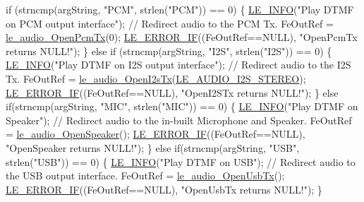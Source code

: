 \begin{DoxyCodeInclude}
{{{{{{{{{{{    \textcolor{keywordflow}{if} (strncmp(argString, \textcolor{stringliteral}{"PCM"}, strlen(\textcolor{stringliteral}{"PCM"})) == 0)
    \{
        \hyperlink{le__log_8h_a23e6d206faa64f612045d688cdde5808}{LE\_INFO}(\textcolor{stringliteral}{"Play DTMF on PCM output interface"});
        \textcolor{comment}{// Redirect audio to the PCM Tx.}
        FeOutRef = \hyperlink{le__audio__interface_8h_a5e112543e8525775aa670dc71b320766}{le\_audio\_OpenPcmTx}(0);
        \hyperlink{le__log_8h_aceaf11a11691d6c676e36dd317b38dbd}{LE\_ERROR\_IF}((FeOutRef==NULL), \textcolor{stringliteral}{"OpenPcmTx returns NULL!"});
    \}
    \textcolor{keywordflow}{else} \textcolor{keywordflow}{if} (strncmp(argString, \textcolor{stringliteral}{"I2S"}, strlen(\textcolor{stringliteral}{"I2S"})) == 0)
    \{
        \hyperlink{le__log_8h_a23e6d206faa64f612045d688cdde5808}{LE\_INFO}(\textcolor{stringliteral}{"Play DTMF on I2S output interface"});
        \textcolor{comment}{// Redirect audio to the I2S Tx.}
        FeOutRef = \hyperlink{le__audio__interface_8h_a2633c1368adf60e342d7cadbbfa6278b}{le\_audio\_OpenI2sTx}(\hyperlink{le__audio__interface_8h_a94794180ed71a84bd26a1f525858f252a6ce77f5f956b203e15f662900a5103dd}{LE\_AUDIO\_I2S\_STEREO});
        \hyperlink{le__log_8h_aceaf11a11691d6c676e36dd317b38dbd}{LE\_ERROR\_IF}((FeOutRef==NULL), \textcolor{stringliteral}{"OpenI2STx returns NULL!"});
    \}
    \textcolor{keywordflow}{else} \textcolor{keywordflow}{if}(strncmp(argString, \textcolor{stringliteral}{"MIC"}, strlen(\textcolor{stringliteral}{"MIC"})) == 0)
    \{
        \hyperlink{le__log_8h_a23e6d206faa64f612045d688cdde5808}{LE\_INFO}(\textcolor{stringliteral}{"Play DTMF on Speaker"});
        \textcolor{comment}{// Redirect audio to the in-built Microphone and Speaker.}
        FeOutRef = \hyperlink{le__audio__interface_8h_a5c19afce44021c4abf6193707317f8de}{le\_audio\_OpenSpeaker}();
        \hyperlink{le__log_8h_aceaf11a11691d6c676e36dd317b38dbd}{LE\_ERROR\_IF}((FeOutRef==NULL), \textcolor{stringliteral}{"OpenSpeaker returns NULL!"});
     \}
    \textcolor{keywordflow}{else} \textcolor{keywordflow}{if}(strncmp(argString, \textcolor{stringliteral}{"USB"}, strlen(\textcolor{stringliteral}{"USB"})) == 0)
    \{
        \hyperlink{le__log_8h_a23e6d206faa64f612045d688cdde5808}{LE\_INFO}(\textcolor{stringliteral}{"Play DTMF on USB"});
        \textcolor{comment}{// Redirect audio to the USB output interface.}
        FeOutRef = \hyperlink{le__audio__interface_8h_adb38f11ac78cf99160c19f69b4db0eb8}{le\_audio\_OpenUsbTx}();
        \hyperlink{le__log_8h_aceaf11a11691d6c676e36dd317b38dbd}{LE\_ERROR\_IF}((FeOutRef==NULL), \textcolor{stringliteral}{"OpenUsbTx returns NULL!"});
    \}

}}}}}}}}}}}
\end{DoxyCodeInclude}
